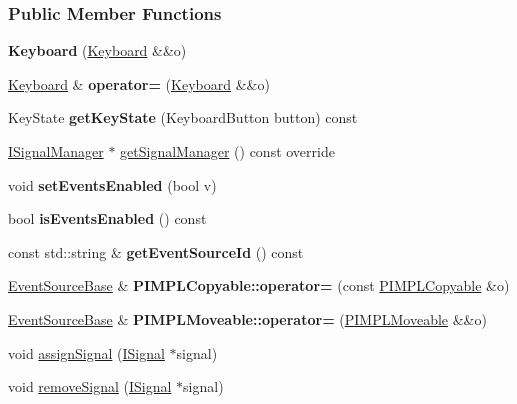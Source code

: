 \subsubsection*{Public Member Functions}
\begin{DoxyCompactItemize}
\item 
{\bfseries Keyboard} (\hyperlink{a00055}{Keyboard} \&\&o)\hypertarget{a00055_ad4410c745ee235f4418feb55656f59e2}{}\label{a00055_ad4410c745ee235f4418feb55656f59e2}

\item 
\hyperlink{a00055}{Keyboard} \& {\bfseries operator=} (\hyperlink{a00055}{Keyboard} \&\&o)\hypertarget{a00055_acbdb16f8b16fe00da53eab07736f6364}{}\label{a00055_acbdb16f8b16fe00da53eab07736f6364}

\item 
Key\+State {\bfseries get\+Key\+State} (Keyboard\+Button button) const \hypertarget{a00055_a89fd597ce678be8a6b50a36b549a5922}{}\label{a00055_a89fd597ce678be8a6b50a36b549a5922}

\item 
\hyperlink{a00051}{I\+Signal\+Manager} $\ast$ \hyperlink{a00055_a324f41177f75c6d08ad6494c36a65806}{get\+Signal\+Manager} () const  override
\item 
void {\bfseries set\+Events\+Enabled} (bool v)\hypertarget{a00036_ae529242181c16462bef9bd6b8fb56b93}{}\label{a00036_ae529242181c16462bef9bd6b8fb56b93}

\item 
bool {\bfseries is\+Events\+Enabled} () const \hypertarget{a00036_a659325f18d666f132f380e4319499572}{}\label{a00036_a659325f18d666f132f380e4319499572}

\item 
const std\+::string \& {\bfseries get\+Event\+Source\+Id} () const \hypertarget{a00036_ad41deeb2b9de38797b10777e5d1ecf13}{}\label{a00036_ad41deeb2b9de38797b10777e5d1ecf13}

\item 
\hyperlink{a00036}{Event\+Source\+Base} \& {\bfseries P\+I\+M\+P\+L\+Copyable\+::operator=} (const \hyperlink{a00060}{P\+I\+M\+P\+L\+Copyable} \&o)\hypertarget{a00060_a26fdb9b3d449d04dc653c7ae942f452b}{}\label{a00060_a26fdb9b3d449d04dc653c7ae942f452b}

\item 
\hyperlink{a00036}{Event\+Source\+Base} \& {\bfseries P\+I\+M\+P\+L\+Moveable\+::operator=} (\hyperlink{a00061}{P\+I\+M\+P\+L\+Moveable} \&\&o)\hypertarget{a00061_ac67025e8a25edffe99fa9bf67ed8ca19}{}\label{a00061_ac67025e8a25edffe99fa9bf67ed8ca19}

\item 
void \hyperlink{a00070_afd9ce54a72b4dd397d82aff6c387d0c0}{assign\+Signal} (\hyperlink{a00050}{I\+Signal} $\ast$signal)
\item 
void \hyperlink{a00070_a5927b57f0d4fb8744dc0e8ec265e0136}{remove\+Signal} (\hyperlink{a00050}{I\+Signal} $\ast$signal)
\end{DoxyCompactItemize}
